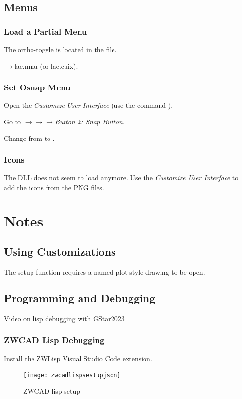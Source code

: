 \documentclass{lebook}
\begin{document}
\section{Menus}
\subsection{Load a Partial Menu}
The  ortho-toggle is located in the  file.
\begin{bulletedlist}
	\item {}$\rightarrow$lae.mnu (or lae.cuix).
\end{bulletedlist}

\subsection{Set Osnap Menu}
\begin{numberedlist}
	\item Open the \textit{Customize User Interface} (use the command ).
	\item Go to $\rightarrow$$\rightarrow$$\rightarrow$\textit{Button 2: Snap Button}.
	\item Change  from  to .
\end{numberedlist}

\subsection{Icons}
The DLL does not seem to load anymore.  Use the \textit{Customize User Interface} to add the icons from the PNG files.

\chapter{Notes}
\section{Using Customizations}
The setup function requires a named plot style drawing to be open.

\section{Programming and Debugging}
\begin{bulletedlist}
	\item \href{https://www.youtube.com/watch?v=Rrgx3TcXNzM}{Video on lisp debugging with GStar2023}
\end{bulletedlist}

\subsection{ZWCAD Lisp Debugging}
\begin{numberedlist}
	\item Install the ZWLisp Visual Studio Code extension.
\end{numberedlist}

\begin{figure}
	\centering
	\texttt{[image: zwcadlispsestupjson]}
	\caption{ZWCAD lisp setup.}
	\label{fig:zwcadlispsestupjson}
\end{figure}
\end{document}
